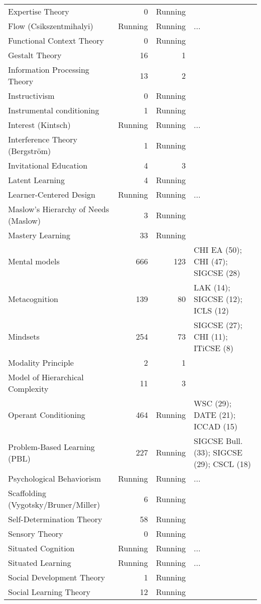 \begin{table*}[t]
\begin{tabular}{lrrp{6cm}}
Expertise Theory & 0 & Running &  \\
Flow (Csikszentmihalyi) & Running & Running & ... \\
Functional Context Theory & 0 & Running &  \\
Gestalt Theory & 16 & 1 &  \\
Information Processing Theory & 13 & 2 &  \\
Instructivism & 0 & Running &  \\
Instrumental conditioning & 1 & Running &  \\
Interest (Kintsch) & Running & Running & ... \\
Interference Theory (Bergström) & 1 & Running &  \\
Invitational Education & 4 & 3 &  \\
Latent Learning & 4 & Running &  \\
Learner-Centered Design & Running & Running & ... \\
Maslow's Hierarchy of Needs (Maslow) & 3 & Running &  \\
Mastery Learning & 33 & Running &  \\
Mental models & 666 & 123 & CHI EA  (50); CHI  (47); SIGCSE  (28) \\
Metacognition & 139 & 80 & LAK  (14); SIGCSE  (12); ICLS  (12) \\
Mindsets & 254 & 73 & SIGCSE  (27); CHI  (11); ITiCSE  (8) \\
Modality Principle & 2 & 1 &  \\
Model of Hierarchical Complexity & 11 & 3 &  \\
Operant Conditioning & 464 & Running & WSC  (29); DATE  (21); ICCAD  (15) \\
Problem-Based Learning (PBL) & 227 & Running & SIGCSE Bull. (33); SIGCSE  (29); CSCL  (18) \\
Psychological Behaviorism & Running & Running & ... \\
Scaffolding (Vygotsky/Bruner/Miller) & 6 & Running &  \\
Self-Determination Theory & 58 & Running &  \\
Sensory Theory & 0 & Running &  \\
Situated Cognition & Running & Running & ... \\
Situated Learning & Running & Running & ... \\
Social Development Theory & 1 & Running &  \\
Social Learning Theory & 12 & Running &  \\

\end{tabular}
\end{table*}

